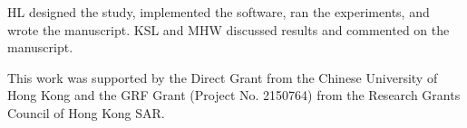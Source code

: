 \documentclass[twocolumn]{svjour3}          %
\begin{document}
HL designed the study, implemented the software, ran the experiments, and wrote the manuscript. KSL and MHW discussed results and commented on the manuscript.

\begin{acknowledgements}

This work was supported by the Direct Grant from the Chinese University of Hong Kong and the GRF Grant (Project No. 2150764) from the Research Grants Council of Hong Kong SAR.

\end{acknowledgements}

\end{document}
